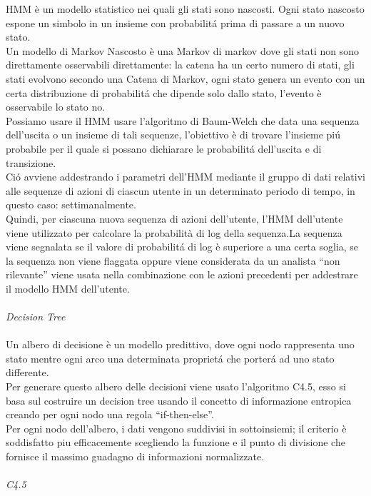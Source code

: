 \documentclass[../tesi.tex]{subfiles}
\begin{document}
HMM è un modello statistico nei quali gli stati sono nascosti. Ogni stato nascosto espone un simbolo in un insieme con probabilitá prima di passare a un nuovo stato.\\
Un modello di Markov Nascosto è una \Gls{Markov} di markov dove gli stati non sono direttamente osservabili direttamente: la catena ha un certo numero di stati, gli stati evolvono secondo una Catena di Markov, ogni stato genera un evento con un certa distribuzione di probabilitá che dipende solo dallo stato, l’evento è osservabile lo stato no.\\
Possiamo usare il HMM usare l’algoritmo di Baum-Welch che data una sequenza dell’uscita o un insieme di tali sequenze, l’obiettivo è di trovare l’insieme piú probabile per il quale si possano dichiarare le probabilitá dell’uscita e di transizione.\\
Ció avviene addestrando i parametri dell’HMM mediante il gruppo di dati relativi alle sequenze di azioni di ciascun utente in un determinato periodo di tempo, in questo caso: settimanalmente.\\
Quindi, per ciascuna nuova sequenza di azioni dell'utente, l'HMM dell'utente viene utilizzato per calcolare la probabilità di log della sequenza.La sequenza viene segnalata se il valore di probabilitá di log è superiore a una certa soglia, se la sequenza non viene flaggata oppure viene considerata da un analista “non rilevante” viene usata nella combinazione con le azioni precedenti per addestrare il modello HMM dell’utente.\\
\\
\textit{Decision Tree}\\
\\
Un albero di decisione è un modello predittivo, dove ogni nodo rappresenta uno stato mentre ogni arco una determinata proprietá che porterá ad uno stato differente.\\
Per generare questo albero delle decisioni viene usato l’algoritmo C4.5, esso si basa sul costruire un decision tree usando il concetto di informazione entropica creando per ogni nodo una regola “if-then-else”.\\
Per ogni nodo dell’albero, i dati vengono suddivisi in sottoinsiemi; il criterio è soddisfatto piu efficacemente scegliendo la funzione e il punto di divisione che fornisce il massimo guadagno di informazioni normalizzate.\\
\\
\textit{C4.5}\\
\\
\end{document}
